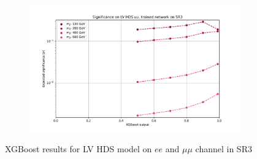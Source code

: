 \documentclass[12pt, a4paper]{book}
\begin{document}
\begin{figure}[!ht]
\begin{subfigure}[b]{0.49\textwidth}
   \end{subfigure}
   \hfill
   \begin{subfigure}[b]{0.49\textwidth}
      \centering
      \includegraphics[width=1\textwidth]{XGBoost/Model_independent/150/LV_HDS/EXP_SIG_uu.pdf}
   \end{subfigure}
   \caption{XGBoost results for LV HDS model on $ee$ and $\mu\mu$ channel in SR3}\label{fig:LV_HDS_SR3}
\end{figure}
\end{document}
